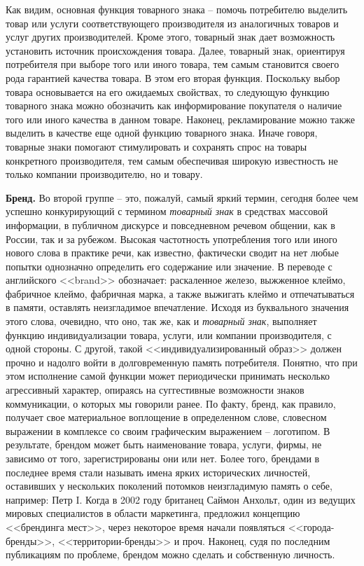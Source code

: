   Как видим, основная функция товарного знака -- помочь потребителю выделить
  товар или услуги соответствующего производителя из аналогичных товаров и услуг
  других производителей. Кроме этого, товарный знак дает возможность установить
  источник происхождения товара. Далее, товарный знак, ориентируя потребителя
  при выборе того или иного товара, тем самым становится своего рода гарантией
  качества товара. В этом его вторая функция. Поскольку выбор товара основывается
  на его ожидаемых свойствах, то следующую функцию товарного знака можно обозначить
  как информирование покупателя о наличие того или иного качества в данном товаре.
  Наконец, рекламирование можно также выделить в качестве еще одной функцию
  товарного знака. Иначе говоря, товарные знаки помогают стимулировать и
  сохранять спрос на товары конкретного производителя, тем самым обеспечивая
  широкую известность не только компании производителю, но и товару.

\textbf{Бренд.} Во второй группе -- это, пожалуй, самый яркий термин,
  сегодня более чем успешно конкурирующий с термином \emph{товарный знак} в
  средствах массовой информации, в публичном дискурсе и повседневном речевом
  общении, как в России, так и за рубежом. Высокая частотность употребления
  того или иного нового слова в практике речи, как известно, фактически
  сводит на нет любые попытки однозначно определить его содержание или значение.
  В переводе с английского <<brand>> обозначает: раскаленное железо, выжженное
  клеймо, фабричное клеймо, фабричная марка, а также выжигать клеймо и
  отпечатываться в памяти, оставлять неизгладимое впечатление\autocite{oxford_dictionary}.
  Исходя из буквального значения этого слова, очевидно, что оно,
  так же, как и \emph{товарный знак}, выполняет функцию индивидуализации товара,
  услуги, или компании производителя, с одной стороны. С другой, такой
  <<индивидуализированный образ>> должен прочно и надолго войти в долговременную
  память потребителя. Понятно, что при этом исполнение самой функции может
  периодически принимать несколько агрессивный характер, опираясь на
  суггестивные возможности знаков коммуникации, о которых мы говорили ранее.
  По факту, бренд, как правило, получает свое материальное воплощение
  в определенном слове, словесном выражении в комплексе со своим
  графическим выражением -- логотипом. В результате, брендом может быть
  наименование товара, услуги, фирмы, не зависимо от того, зарегистрированы
  они или нет. Более того, брендами в последнее время стали называть имена
  ярких исторических личностей, оставивших у нескольких поколений потомков
  неизгладимую память о себе, например: Петр I. Когда в 2002 году британец
  Саймон Анхольт, один из ведущих мировых специалистов в области маркетинга,
  предложил концепцию <<брендинга мест>>, через некоторое время начали
  появляться <<города-бренды>>, <<территории-бренды>>  и
  проч\autocite{brending}. Наконец, судя по последним публикациям по проблеме,
  брендом можно сделать и собственную личность.
  \autocite{peters1999brand}\autocite{schawbel2009me}\autocite{deckers2012branding}

